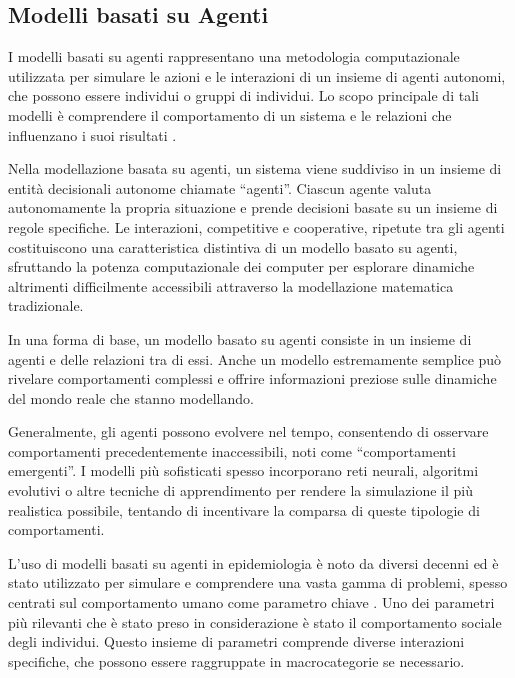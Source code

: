 \subsection{Modelli basati su Agenti}

I modelli basati su agenti rappresentano una metodologia computazionale 
utilizzata per simulare le azioni e le interazioni di un insieme di agenti 
autonomi, che possono essere individui o gruppi di individui. 
Lo scopo principale di tali modelli è comprendere il comportamento di un 
sistema e le relazioni che influenzano i suoi risultati \cite{7822080}.

Nella modellazione basata su agenti, un sistema viene suddiviso in un 
insieme di entità decisionali autonome chiamate ``agenti''. Ciascun agente 
valuta autonomamente la propria situazione e prende decisioni basate su 
un insieme di regole specifiche. Le interazioni, competitive e cooperative, ripetute tra gli agenti costituiscono una 
caratteristica distintiva di un modello basato su agenti, sfruttando la 
potenza computazionale dei computer per esplorare dinamiche altrimenti 
difficilmente accessibili attraverso la modellazione matematica tradizionale.

In una forma di base, un modello basato su agenti consiste in un insieme 
di agenti e delle relazioni tra di essi. Anche un modello estremamente 
semplice può rivelare comportamenti complessi e offrire informazioni 
preziose sulle dinamiche del mondo reale che stanno modellando.

Generalmente, gli agenti possono evolvere nel tempo, consentendo di 
osservare comportamenti precedentemente inaccessibili, noti come 
``comportamenti emergenti''. I modelli più sofisticati spesso incorporano 
reti neurali, algoritmi evolutivi o altre tecniche di apprendimento per 
rendere la simulazione il più realistica possibile, tentando di 
incentivare la comparsa di queste tipologie di comportamenti.

L'uso di modelli basati su agenti in epidemiologia è noto da diversi 
decenni ed è stato utilizzato per simulare e comprendere una vasta gamma 
di problemi, spesso centrati sul comportamento umano come parametro chiave 
\cite{Bissett2021} \cite{El-Sayed2012-ac} \cite{Groff2019} \cite{Tracy2018-lc}. 
Uno dei parametri più rilevanti che è stato preso in considerazione è 
stato il comportamento sociale degli individui. Questo insieme di 
parametri comprende diverse interazioni specifiche, che possono essere 
raggruppate in macrocategorie se necessario.

